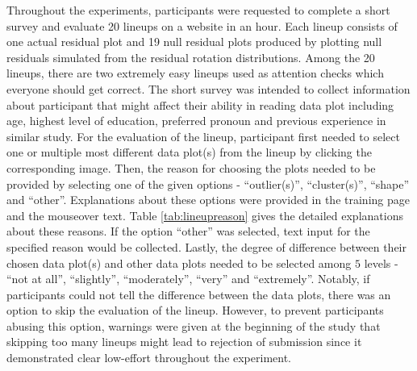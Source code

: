 \documentclass{monashthesis}
\begin{document}
Throughout the experiments, participants were requested to complete a short survey and evaluate 20 lineups on a website in an hour. Each lineup consists of one actual residual plot and 19 null residual plots produced by plotting null residuals simulated from the residual rotation distributions. Among the 20 lineups, there are two extremely easy lineups used as attention checks which everyone should get correct. The short survey was intended to collect information about participant that might affect their ability in reading data plot including age, highest level of education, preferred pronoun and previous experience in similar study. For the evaluation of the lineup, participant first needed to select one or multiple most different data plot(s) from the lineup by clicking the corresponding image. Then, the reason for choosing the plots needed to be provided by selecting one of the given options - ``outlier(s)'', ``cluster(s)'', ``shape'' and ``other''. Explanations about these options were provided in the training page and the mouseover text. Table \ref{tab:lineupreason} gives the detailed explanations about these reasons. If the option ``other'' was selected, text input for the specified reason would be collected. Lastly, the degree of difference between their chosen data plot(s) and other data plots needed to be selected among \(5\) levels - ``not at all'', ``slightly'', ``moderately'', ``very'' and ``extremely''. Notably, if participants could not tell the difference between the data plots, there was an option to skip the evaluation of the lineup. However, to prevent participants abusing this option, warnings were given at the beginning of the study that skipping too many lineups might lead to rejection of submission since it demonstrated clear low-effort throughout the experiment.

\begin{table}

\caption{\label{tab:lineupreason}Explanations about reasons for choosing data plots from a lineup}
\centering
{}
\end{table}
\end{document}
